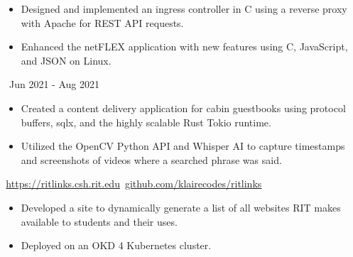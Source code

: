 \documentclass[11pt,letterpaper,ragged2e]{altacv}
\begin{document}
{
	\begin{itemize}
		\item Designed and implemented an ingress controller in C using a reverse proxy with Apache for REST API requests.
		\item Enhanced the netFLEX application with new features using C, JavaScript, and JSON on Linux.
	\end{itemize}
}
{\faCalendar\, Jun 2021 - Aug 2021}
{
}



{
	\begin{itemize}
		\item Created a content delivery application for cabin guestbooks using protocol buffers, sqlx, and the highly scalable Rust Tokio runtime.
	\end{itemize}
}
{
}

{
	\begin{itemize}
		\item Utilized the OpenCV Python API and Whisper AI to capture timestamps and screenshots of videos where a searched phrase was said.
	\end{itemize}
}
{
}

{
	{\faLink} \,\href{https://ritlinks.csh.rit.edu}{https://ritlinks.csh.rit.edu}\quad
	{\faGithub} \,\href{https://github.com/klairecodes/ritlinks}{github.com/klairecodes/ritlinks}
}
{
	\begin{itemize}
		\item Developed a site to dynamically generate a list of all websites RIT makes available to students and their uses.
		\item Deployed on an OKD 4 Kubernetes cluster.
	\end{itemize}
}
{
}


\clearpage

\nocite{*}
\end{document}
